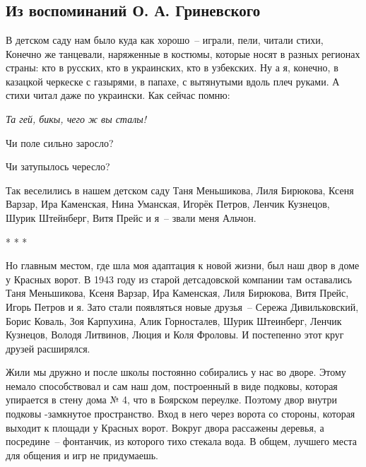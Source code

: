\chapter{}

\section*{Из воспоминаний О. А. Гриневского}

﻿В детском саду нам было куда как хорошо~-- играли, пели, читали стихи, Конечно же танцевали, наряженные в костюмы, которые носят в разных регионах страны: кто в русских, кто в украинских, кто в узбекских. Ну а я, конечно, в казацкой черкеске с газырями, в папахе, с вытянутыми вдоль плеч руками. А стихи читал даже по украински. Как сейчас помню: 

\indent

{\itshape
Та гей, бикы, чего ж вы сталы! 

Чи поле сильно заросло? 

Чи затупылось чересло?
}

\indent

Так  веселились  в  нашем  детском   саду  Таня  Меньшикова,   Лиля Бирюкова, Ксеня Варзар, Ира Каменская, Нина Уманская, Игорёк Петров, Ленчик Кузнецов, Шурик Штейнберг, Витя Прейс и я~-- звали меня Альчон. 

\indent

\begin{center} 
    * * *
\end{center}

\indent

Но главным местом, где шла моя адаптация к новой жизни, был наш двор в доме у Красных ворот. В 1943 году из старой детсадовской компании там оставались Таня Меньшикова, Ксеня Варзар, Ира Каменская, Лиля Бирюкова, Витя Прейс, Игорь Петров и я. Зато стали появляться новые друзья~-- Сережа Дивильковский, Борис Коваль, Зоя Карпухина, Алик Горносталев, Шурик Штеинберг, Ленчик Кузнецов, Володя Литвинов, Люция и Коля Фроловы. И постепенно этот круг друзей расширялся.

Жили мы дружно и после школы постоянно собирались у нас во дворе. Этому немало способствовал и сам наш дом, построенный в виде подковы, которая упирается в стену дома № 4, что в Боярском переулке. Поэтому двор внутри подковы -замкнутое пространство. Вход в него через ворота со стороны, которая выходит к площади у Красных ворот. Вокруг двора рассажены деревья, а посредине~-- фонтанчик, из которого тихо стекала вода. В общем, лучшего места для общения и игр не придумаешь.

